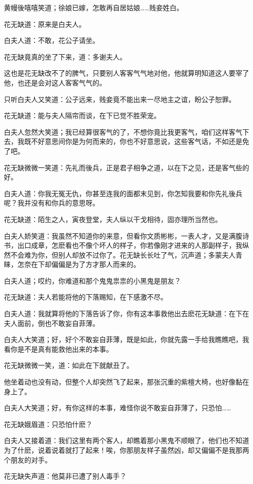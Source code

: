 \documentclass[12pt,oneside]{book}
\begin{document}
黄幔後嘻嘻笑道；徐娘已嫁，怎敢再自居姑娘\ldots\ldots 贱妾姓白。

花无缺道：原来是白夫人。

白夫人道：不敢，花公子请坐。

花无缺竟真的坐了下来，道：多谢夫人。

这也是花无缺改不了的脾气，只要别人客客气气地对他，他就算明知道这人要宰了他，也还是会对这人客客气气的。

只听白夫人又笑道：公子远来，贱妾竟不能出来一尽地主之谊，盼公子恕罪。

花无缺道：能与夫人隔帘而谈，在下已觉不胜荣宠。

白夫人忽然大笑道；我已经算很客气的了，不想你竟比我更客气，咱们这样客气下去，我既不好意思间你是为何而来的，你也不好意思说，这些客气话，不如还是免了吧。

花无缺微微一笑道：先礼而後兵，正是君子相争之道，以在下之见，还是客气些的好。

白夫人道：你我无冤无仇，你甚至连我的面都末见到，你怎知我要和你先礼後兵呢？我并没有和你兵的意思呀。

花无缺道：陌生之人，寅夜登堂，夫人纵以干戈相待，固亦理所当然也。

白夫人娇笑道：我虽然不知道你的来意，但看你文质彬彬，一表人才，又是满腹诗书，出口成章，怎麽看也不像个坏人的样子，你若像刚才进来的人那副样子，我纵然不会难为你，但别人却放不过你了。花无缺长长吐了气，沉声道；多蒙夫人青睐，怎奈在下却偏偏是为了方才那人而来的。

白夫人道；哎约，你难道和那个鬼鬼祟祟的小黑鬼是朋友？

花无缺道：夫人若能将他的下落赐知，在下感激不尽。

白夫人道：我就算将他的下落告诉了你，你有这本事救他出去麽花无缺道：在下在夫人面前，倒也不敢妄自菲薄。

白夫人大笑道；好，好个不敢妄自菲薄，既是如此，你就先露一手给我瞧瞧吧，我看你是不是真有能救他出来的本事。

花无缺微微一笑，道：如此在下就献丑了。

他坐着动也没有动，但整个人却突然飞了起来，那张沉重的紫檀大椅，也好像黏在身上了。

白夫人大笑道；好，有你这样的本事，难怪你说不敢妄自菲薄了，只恐怕\ldots\ldots{}

花无缺娥眉道：只恐怕什麽？

白夫人又接着道：我们这里有两个客人，却瞧着那小黑鬼不顺眼了，他们也不知道为了什麽，说着说着就打了起来！唉，你那朋友样子虽然凶，却又偏偏不是我那两个朋友的对手。

花无缺失声道：他莫非已遭了别人毒手？
\end{document}
